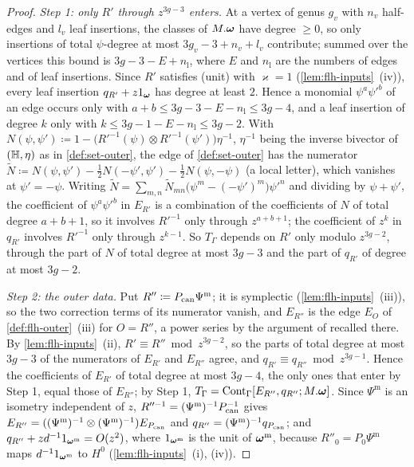 \begin{proof}
\emph{Step 1: only $R'$ through $z^{3g-3}$ enters.} At a vertex of genus $g_v$ with $n_v$ half-edges and $l_v$ leaf insertions, the classes of $M.\boldsymbol{\omega}$ have degree $\geq0$, so only insertions of total $\psi$-degree at most $3g_v-3+n_v+l_v$ contribute; summed over the vertices this bound is $3g-3-E+n_{\mathrm l}$, where $E$ and $n_{\mathrm l}$ are the numbers of edges and of leaf insertions. Since $R'$ satisfies (unit) with $\varkappa=1$ (\cref{lem:flh-inputs}~(iv)), every leaf insertion $q_{R'}+z1_{\boldsymbol{\omega}}$ has degree at least $2$. Hence a monomial $\psi^a\psi'^b$ of an edge occurs only with $a+b\leq 3g-3-E-n_{\mathrm l}\leq 3g-4$, and a leaf insertion of degree $k$ only with $k\leq 3g-1-E-n_{\mathrm l}\leq 3g-2$. With $N(\psi,\psi')\coloneqq1-\bigl(R'^{-1}(\psi)\otimes R'^{-1}(\psi')\bigr)\eta^{-1}$, $\eta^{-1}$ being the inverse bivector of $(\mathbb{H},\eta)$ as in \cref{def:set-outer}, the edge of \cref{def:set-outer} has the numerator $\tilde N\coloneqq N(\psi,\psi')-\frac12N(-\psi',\psi')-\frac12N(\psi,-\psi)$ (a local letter), which vanishes at $\psi'=-\psi$. Writing $\tilde N=\sum_{m,n}\tilde N_{mn}\bigl(\psi^m-(-\psi')^m\bigr)\psi'^n$ and dividing by $\psi+\psi'$, the coefficient of $\psi^a\psi'^b$ in $E_{R'}$ is a combination of the coefficients of $N$ of total degree $a+b+1$, so it involves $R'^{-1}$ only through $z^{a+b+1}$; the coefficient of $z^k$ in $q_{R'}$ involves $R'^{-1}$ only through $z^{k-1}$. So $T_\Gamma$ depends on $R'$ only modulo $z^{3g-2}$, through the part of $N$ of total degree at most $3g-3$ and the part of $q_{R'}$ of degree at most $3g-2$.

\emph{Step 2: the outer data.} Put $R''\coloneqq P_{\mathrm{can}}\Psi^{\mathrm m}$; it is symplectic (\cref{lem:flh-inputs}~(iii)), so the two correction terms of its numerator vanish, and $E_{R''}$ is the edge $E_O$ of \cref{def:flh-outer}~(iii) for $O=R''$, a power series by the argument of \cite[Rem.~2.1 and (6)]{PPZ15} recalled there. By \cref{lem:flh-inputs}~(ii), $R'\equiv R''\bmod z^{3g-2}$, so the parts of total degree at most $3g-3$ of the numerators of $E_{R'}$ and $E_{R''}$ agree, and $q_{R'}\equiv q_{R''}\bmod z^{3g-1}$. Hence the coefficients of $E_{R'}$ of total degree at most $3g-4$, the only ones that enter by Step 1, equal those of $E_{R''}$; by Step 1, $T_\Gamma=\mathrm{Cont}_\Gamma[E_{R''},q_{R''};M.\boldsymbol{\omega}]$. Since $\Psi^{\mathrm m}$ is an isometry independent of $z$, $R''^{-1}=(\Psi^{\mathrm m})^{-1}P_{\mathrm{can}}^{-1}$ gives $E_{R''}=((\Psi^{\mathrm m})^{-1}\otimes(\Psi^{\mathrm m})^{-1})E_{P_{\mathrm{can}}}$ and $q_{R''}=(\Psi^{\mathrm m})^{-1}q_{P_{\mathrm{can}}}$; and $q_{R''}+zd^{-1}1_{\boldsymbol{\omega}^{\mathrm m}}=O(z^2)$, where $1_{\boldsymbol{\omega}^{\mathrm m}}$ is the unit of $\boldsymbol{\omega}^{\mathrm m}$, because $R''_0=P_0\Psi^{\mathrm m}$ maps $d^{-1}1_{\boldsymbol{\omega}^{\mathrm m}}$ to $H^0$ (\cref{lem:flh-inputs}~(i), (iv)).


\end{proof}
